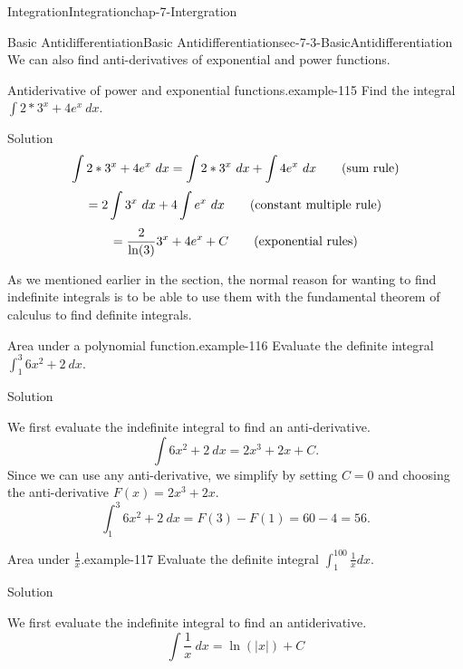 \documentclass[oneside,10pt,]{book}
\numberwithin{equation}{section}
\begin{document}
\begin{chapterptx}{Integration}{}{Integration}{}{}{chap-7-Intergration}
\begin{sectionptx}{Basic Antidifferentiation}{}{Basic Antidifferentiation}{}{}{sec-7-3-BasicAntidifferentiation}
\hypertarget{p-2751}{}%
We can also find anti-derivatives of exponential and power functions.%
\begin{example}{Antiderivative of power and exponential functions.}{example-115}%
\hypertarget{p-2752}{}%
Find the integral \(\int 2*3^x+4e^x\ dx\).%
\par
\hypertarget{p-2753}{}%
Solution%
%
\begin{equation*}
\int 2*3^x+4e^x\ dx=\int 2*3^x\ dx+\int 4e^x\ dx\qquad\hbox{(sum rule)}
\end{equation*}
%
\begin{equation*}
=2\int 3^x\ dx+4\int e^x\ dx\qquad\hbox{(constant multiple rule)}
\end{equation*}
%
\begin{equation*}
=\frac{2}{\ln(3)} 3^x+4 e^x+C\qquad\hbox{(exponential rules)}
\end{equation*}
\end{example}
\hypertarget{p-2754}{}%
As we mentioned earlier in the section, the normal reason for wanting to find indefinite integrals is to be able to use them with the fundamental theorem of calculus to find definite integrals.%
\begin{example}{Area under a polynomial function.}{example-116}%
\hypertarget{p-2755}{}%
Evaluate the definite integral \(\int_1^3 6x^2+2\ dx\).%
\par
\hypertarget{p-2756}{}%
Solution%
\par
\hypertarget{p-2757}{}%
We first evaluate the indefinite integral to find an anti-derivative.%
%
\begin{equation*}
\int 6x^2+2\ dx=2x^3+2x+C.
\end{equation*}
\hypertarget{p-2758}{}%
Since we can use any anti-derivative, we simplify by setting \(C = 0\) and choosing the anti-derivative  \(F(x)=2x^3+2x\).%
%
\begin{equation*}
\int_1^3 6x^2+2\ dx=F(3)-F(1)=60-4=56.
\end{equation*}
\end{example}
\begin{example}{Area under \(\frac{1}{x}\).}{example-117}%
\hypertarget{p-2759}{}%
Evaluate the definite integral \(\int_1^{100}\frac{1}{x} dx\).%
\par
\hypertarget{p-2760}{}%
Solution%
\par
\hypertarget{p-2761}{}%
We first evaluate the indefinite integral to find an antiderivative.%
%
\begin{equation*}
\int \frac{1}{x}\ dx=\ln(|x|)+C
\end{equation*}

\end{example}
\end{sectionptx}
\end{chapterptx}
\end{document}
